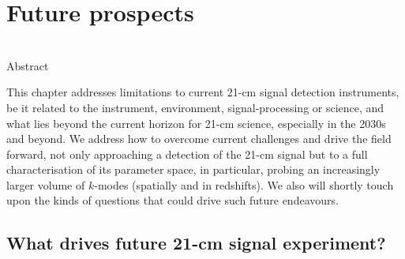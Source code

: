 \chapter{Future prospects}
\label{chapter:koopmans_bernardi}

\begin{bf}
  \author{L\'{e}on V. E. Koopmans (Kapteyn Astronomical Institute, University of Groningen),\\ Gianni Bernardi (INAF-IRA \& Rhodes University)}\\
  
Abstract\\
\end{bf}

\noindent This chapter addresses limitations to current 21-cm signal detection instruments, be it related to the instrument, environment, signal-processing or science, and what lies beyond the current horizon for 21-cm science, especially in the 2030s and beyond. We address how to overcome current challenges and drive the field forward, not only approaching a detection of the 21-cm signal but to a full characterisation of its parameter space, in particular, probing an increasingly larger volume of $k$-modes (spatially and in redshifts). We also will shortly touch upon the kinds of questions that could drive such future endeavours. 

\section{What drives future 21-cm signal experiment?}

